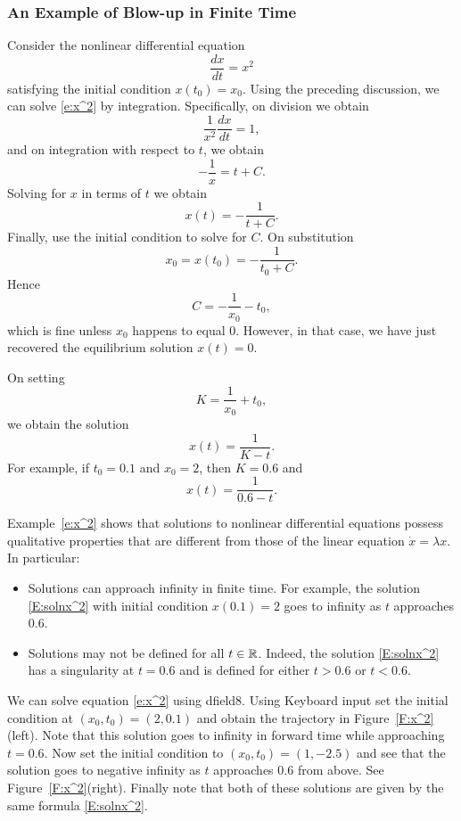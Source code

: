 \documentclass{ximera}
\begin{document}
\subsubsection*{An Example of Blow-up in Finite Time}

Consider the nonlinear differential equation
\begin{equation}  \label{e:x^2}
\frac{dx}{dt} = x^2
\end{equation}
satisfying the initial condition $x(t_0)=x_0$.  Using the preceding 
discussion, we can solve \eqref{e:x^2} by integration.  Specifically,
on division we obtain
\[
\frac{1}{x^2}\frac{dx}{dt} = 1,
\]
and on integration with respect to $t$, we obtain
\[
-\frac{1}{x} = t + C.
\]
Solving for $x$ in terms of $t$ we obtain
\[
x(t) = - \frac{1}{t+C}.
\]
Finally, use the initial condition to solve for $C$. On substitution 
\[
x_0 = x(t_0) = - \frac{1}{t_0+C}.
\]
Hence
\[
C = -\frac{1}{x_0} - t_0,
\]
which is fine unless $x_0$ happens to equal $0$.  However, in that case, we 
have just recovered the equilibrium solution $x(t)=0$.

On setting
\[
K = \frac{1}{x_0}+t_0,
\]
we obtain the solution
\[
x(t) =  \frac{1}{K-t}.
\]
For example, if $t_0=0.1$ and $x_0=2$, then $K=0.6$ and
\begin{equation} \label{E:solnx^2}
x(t) = \frac{1}{0.6-t}.
\end{equation}

Example~\eqref{e:x^2} shows that solutions to nonlinear differential
equations possess 
qualitative properties that are different from 
those of the linear equation $\dot{x}=\lambda x$.  In particular:
\begin{itemize}
\item Solutions can approach infinity in finite time.   For example, 
the solution \eqref{E:solnx^2} with initial condition $x(0.1)=2$ goes to 
infinity as $t$ approaches $0.6$.   
\item Solutions may not be defined for all $t\in\mbox{$\Bbb{R}$}$.  Indeed, the 
solution \eqref{E:solnx^2} has a singularity at $t=0.6$ and is defined 
for either $t> 0.6$ or $t<0.6$.  
\end{itemize}


We can solve equation \eqref{e:x^2} using 
{\sf dfield8}.
Using {\sf Keyboard input} set the initial condition at
$(x_0,t_0)=(2,0.1)$ and obtain the trajectory in
Figure~\ref{F:x^2}(left).  Note that this solution goes to infinity
in forward time while approaching $t=0.6$.  Now set the initial
condition to $(x_0,t_0)=(1,-2.5)$ and see that the solution goes
to negative infinity as $t$ approaches $0.6$ from above.  See
Figure~\ref{F:x^2}(right).  Finally note that both of these
solutions are given by the same formula \eqref{E:solnx^2}.
\end{document}
